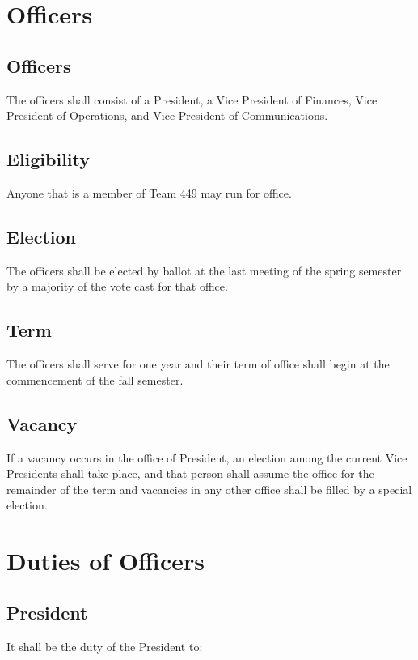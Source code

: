 \documentclass[12pt, a4paper]{article}
\begin{document}
\section{Officers}
\subsection{Officers}
The officers shall consist of a President, a Vice President of Finances, Vice President of Operations, and Vice President of Communications.
\subsection{Eligibility}
Anyone that is a member of Team 449 may run for office.  
\subsection{Election}
The officers shall be elected by ballot at the last meeting of the spring semester by a majority of the vote cast for that office.
\subsection{Term}
The officers shall serve for one year and their term of office shall begin at the commencement of the fall semester.
\subsection{Vacancy}
If a vacancy occurs in the office of President, an election among the current Vice Presidents shall take place, and that person shall assume the office for the remainder of the term and vacancies in any other office shall be filled by a special election.
\section{Duties of Officers}
\subsection{President}
It shall be the duty of the President to:
\end{document}
